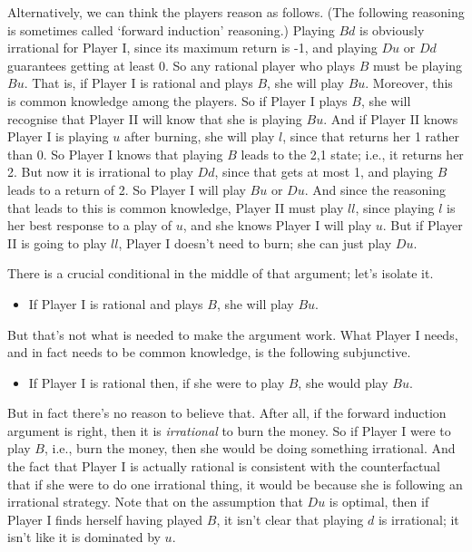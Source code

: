 \documentclass[
  11pt,
  letterpaper,
]{scrbook}
\providecommand{\tightlist}{%
  \setlength{\itemsep}{0pt}\setlength{\parskip}{0pt}}
\begin{document}
Alternatively, we can think the players reason as follows. (The
following reasoning is sometimes called `forward induction' reasoning.)
Playing \(Bd\) is obviously irrational for Player I, since its maximum
return is -1, and playing \(Du\) or \(Dd\) guarantees getting at least
0. So any rational player who plays \(B\) must be playing \(Bu\). That
is, if Player I is rational and plays \(B\), she will play \(Bu\).
Moreover, this is common knowledge among the players. So if Player I
plays \(B\), she will recognise that Player II will know that she is
playing \(Bu\). And if Player II knows Player I is playing \(u\) after
burning, she will play \(l\), since that returns her 1 rather than 0. So
Player I knows that playing \(B\) leads to the 2,1 state; i.e., it
returns her 2. But now it is irrational to play \(Dd\), since that gets
at most 1, and playing \(B\) leads to a return of 2. So Player I will
play \(Bu\) or \(Du\). And since the reasoning that leads to this is
common knowledge, Player II must play \(ll\), since playing \(l\) is her
best response to a play of \(u\), and she knows Player I will play
\(u\). But if Player II is going to play \(ll\), Player I doesn't need
to burn; she can just play \(Du\).

There is a crucial conditional in the middle of that argument; let's
isolate it.

\begin{itemize}
\tightlist
\item
  If Player I is rational and plays \(B\), she will play \(Bu\).
\end{itemize}

But that's not what is needed to make the argument work. What Player I
needs, and in fact needs to be common knowledge, is the following
subjunctive.

\begin{itemize}
\tightlist
\item
  If Player I is rational then, if she were to play \(B\), she would
  play \(Bu\).
\end{itemize}

But in fact there's no reason to believe that. After all, if the forward
induction argument is right, then it is \emph{irrational} to burn the
money. So if Player I were to play \(B\), i.e., burn the money, then she
would be doing something irrational. And the fact that Player I is
actually rational is consistent with the counterfactual that if she were
to do one irrational thing, it would be because she is following an
irrational strategy. Note that on the assumption that \(Du\) is optimal,
then if Player I finds herself having played \(B\), it isn't clear that
playing \(d\) is irrational; it isn't like it is dominated by \(u\).
\end{document}
